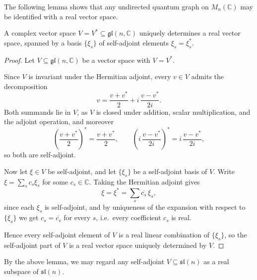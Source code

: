 The following lemma shows that any undirected quantum graph on
\( M_n (\mathbb{C}) \) may be identified with a real vector space.

\begin{lemma}
    \label{lem:self-adjoint-uniqueness}
    A complex vector space \( V = V^* \subseteq \mathfrak{gl}(n, \mathbb{C})\)
    uniquely determines a real vector space, spanned by a basis
    \( \{\xi_s\} \) of self-adjoint elements \( \xi_s = \xi_s^* \).
\end{lemma}

\begin{proof}
    Let \( V \subseteq \mathfrak{gl}(n, \mathbb{C}) \) be a vector space with
    \( V = V^* \).

    Since \( V \) is invariant under the Hermitian adjoint, every
    \( v \in V \) admits the decomposition
    \[
        v = \frac{v + v^*}{2} + i\,\frac{v - v^*}{2i}.
    \]
    Both summands lie in \( V \), as \( V \) is closed under addition,
    scalar multiplication, and the adjoint operation, and moreover
    \[
        \left(\frac{v+v^*}{2}\right)^* = \frac{v+v^*}{2}, \qquad
        \left(i\,\frac{v-v^*}{2i}\right)^* = i\,\frac{v-v^*}{2i},
    \]
    so both are self-adjoint.

    Now let \( \xi \in V \) be self-adjoint, and let \( \{\xi_s\} \) be a
    self-adjoint basis of \( V \). Write \( \xi = \sum_s c_s \xi_s \) for
    some \( c_s \in \mathbb{C} \). Taking the Hermitian adjoint gives
    \[
        \xi = \xi^* = \sum_s \overline{c_s}\, \xi_s,
    \]
    since each \( \xi_s \) is self-adjoint, and by uniqueness of the
    expansion with respect to \( \{\xi_s\} \) we get \( c_s = \overline{c_s} \)
    for every \( s \), i.e.\ every coefficient \( c_s \) is real.

    Hence every self-adjoint element of \( V \) is a real linear
    combination of \( \{\xi_s\} \), so the self-adjoint part of \( V \)
    is a real vector space uniquely determined by \( V \).
\end{proof}

By the above lemma, we may regard any self-adjoint
\( V \subseteq \mathfrak{sl}(n) \) as a real subspace of
\( \mathfrak{sl}(n) \).

